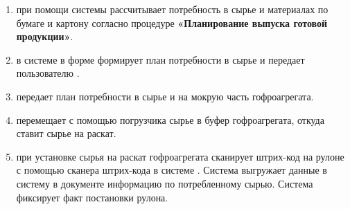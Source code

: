 \begin{enumerate}





\item 	\planner при помощи системы \gofro рассчитывает потребность в сырье и материалах по бумаге и картону согласно процедуре \textbf{«Планирование выпуска готовой продукции»}.
\item 	\planner в системе \gofro в форме  
формирует план потребности в сырье  и передает пользователю \master.
\item	\master передает план потребности в сырье \driver и \linkoperator на мокрую часть гофроагрегата. 
\item	\driver перемещает с помощью погрузчика сырье в буфер гофроагрегата, откуда \linkoperator ставит сырье на раскат.
\item	\linkoperator при установке сырья на раскат гофроагрегата сканирует штрих-код на рулоне с помощью сканера штрих-кода в системе \syncro.
Система \syncro выгружает данные в систему \gofro в документе  информацию по потребленному сырью. Система \gofro фиксирует факт постановки рулона.


\end{enumerate}




